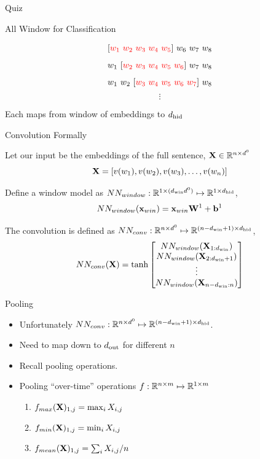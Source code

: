 \documentclass{beamer}
\begin{document}
\begin{frame}{Quiz}
\begin{itemize}
\begin{frame}{All Window for Classification}
  
     \[ [\textcolor{red}{w_1 \ w_2\ w_3\ w_4\ w_5}]\ w_6\ w_7\ w_8 \]
     \[ w_1\ [\textcolor{red}{w_2\ w_3\ w_4\ w_5\ w_6}]\ w_7\ w_8 \]
     \[ w_1\ w_2\ [\textcolor{red}{w_3\ w_4\ w_5\ w_6\ w_7}]\ w_8 \]
     \[ \vdots\] 

     Each maps from window of embeddings to ${d_{\mathrm{hid}}}$ 
\end{frame}

\begin{frame}{Convolution Formally}
  

  Let our input be the embeddings of the full sentence, $\mathbf{X} \in \mathbb{R}^{n \times d^0}$ 
  \[\mathbf{X} = [v(w_1), v(w_2), v(w_3), \ldots, v(w_n)]\]

  Define a window model as $NN_{window}: \mathbb{R}^{1\times ({d_{\mathrm{win}}} d^0) } \mapsto \mathbb{R}^{1\times {d_{\mathrm{hid}}}}$,
  \[NN_{window}(\mathbf{x}_{win}) = \mathbf{x}_{win} \mathbf{W}^1 + \mathbf{b}^1   \]

  The convolution is defined as $NN_{conv}: \mathbb{R}^{n\times d^0} \mapsto \mathbb{R}^{(n - {d_{\mathrm{win}}} + 1) \times {d_{\mathrm{hid}}}}$, 
  \[NN_{conv}(\mathbf{X}) = \tanh \begin{bmatrix}NN_{window}(\mathbf{X}_{1:{d_{\mathrm{win}}}}) \\   
    NN_{window}(\mathbf{X}_{2:{d_{\mathrm{win}}}+1}) \\
    \vdots \\ 
    NN_{window}(\mathbf{X}_{n-{d_{\mathrm{win}}}:n}) \\
  \end{bmatrix}  \]

\end{frame}


\begin{frame}{Pooling}
  \begin{itemize}
  \item Unfortunately $NN_{conv}: \mathbb{R}^{n\times d^0 } \mapsto
    \mathbb{R}^{(n - {d_{\mathrm{win}}} + 1) \times {d_{\mathrm{hid}}}}$.
    \air 

  \item Need to map down to ${d_{\mathrm{out}}}$ for different $n$
    \air 

  \item Recall pooling operations. 
    \air 

  \item Pooling ``over-time'' operations $f: \mathbb{R}^{n\times m} \mapsto \mathbb{R}^{1 \times m}  $ 


  \begin{enumerate}
  \item $ f_{max}(\mathbf{X})_{1, j} = \max_{i} X_{i, j} $
  \item $ f_{min}(\mathbf{X})_{1, j} = \min_{i} X_{i, j} $
  \item $ f_{mean}(\mathbf{X})_{1, j} = \sum_i X_{i,j} / n $
  \end{enumerate}


\end{itemize}
\end{frame}
\end{itemize}
\end{frame}
\end{document}
